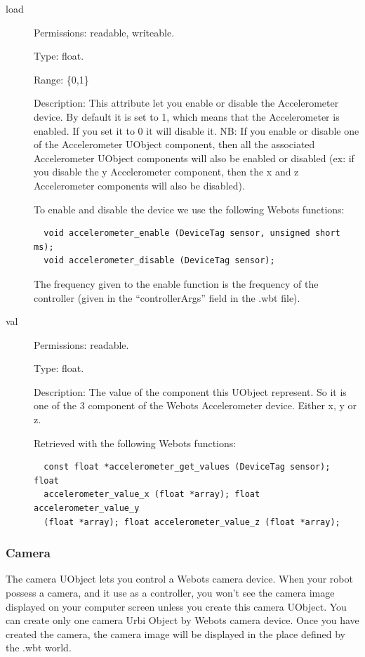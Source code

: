 \noindent
\begin{description}
\item[{load}] Permissions: readable, writeable.


  Type: float.


  Range: \{0,1\}


  Description: This attribute let you enable or disable the
  Accelerometer device.  By default it is set to 1, which means that
  the Accelerometer is enabled. If you set it to 0 it will disable
  it. NB: If you enable or disable one of the Accelerometer UObject
  component, then all the associated Accelerometer UObject components
  will also be enabled or disabled (ex: if you disable the y
  Accelerometer component, then the x and z Accelerometer components
  will also be disabled).


  To enable and disable the device we use the following Webots
  functions:


\begin{lstlisting}
  void accelerometer_enable (DeviceTag sensor, unsigned short ms);
  void accelerometer_disable (DeviceTag sensor);
\end{lstlisting}

The frequency given to the enable function is the frequency of the
\urbi controller (given in the ``controllerArgs'' field in the .wbt
file).

\item[{ val }] Permissions: readable.


  Type: float.


  Description: The value of the component this UObject represent. So
  it is one of the 3 component of the Webots Accelerometer
  device. Either x, y or z.


  Retrieved with the following Webots functions:


\begin{lstlisting}
  const float *accelerometer_get_values (DeviceTag sensor); float
  accelerometer_value_x (float *array); float accelerometer_value_y
  (float *array); float accelerometer_value_z (float *array);
\end{lstlisting}
\end{description}

\subsubsection{Camera}
\label{webots.uobjects.robotdevices.camera}%

   The camera UObject lets you control a Webots camera device. When your robot
  possess a camera, and it use
  \urbi as a controller, you won't see the camera image displayed on your computer
  screen unless you create this camera UObject. You can create only one
  camera Urbi Object by Webots camera device. Once you have created the camera,
  the camera image will be displayed in the place defined by the .wbt world.


